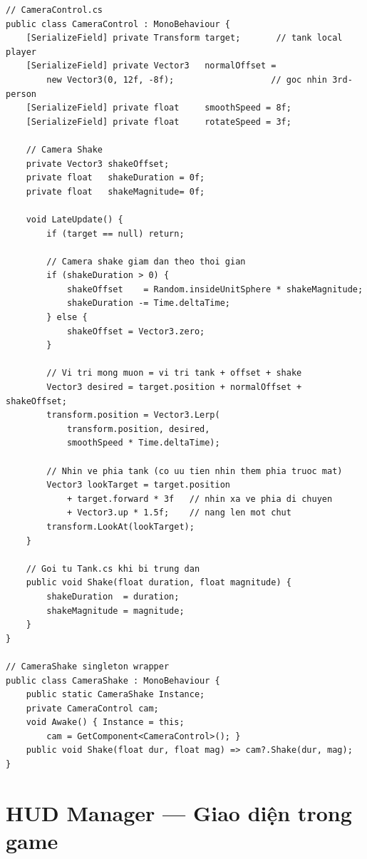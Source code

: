 \documentclass[12pt,a4paper]{report}
\begin{document}
\begin{lstlisting}[style=bashStyle, caption={CameraControl --- smooth follow camera với camera shake}, label={lst:camera}]
// CameraControl.cs
public class CameraControl : MonoBehaviour {
    [SerializeField] private Transform target;       // tank local player
    [SerializeField] private Vector3   normalOffset =
        new Vector3(0, 12f, -8f);                   // goc nhin 3rd-person
    [SerializeField] private float     smoothSpeed = 8f;
    [SerializeField] private float     rotateSpeed = 3f;

    // Camera Shake
    private Vector3 shakeOffset;
    private float   shakeDuration = 0f;
    private float   shakeMagnitude= 0f;

    void LateUpdate() {
        if (target == null) return;

        // Camera shake giam dan theo thoi gian
        if (shakeDuration > 0) {
            shakeOffset    = Random.insideUnitSphere * shakeMagnitude;
            shakeDuration -= Time.deltaTime;
        } else {
            shakeOffset = Vector3.zero;
        }

        // Vi tri mong muon = vi tri tank + offset + shake
        Vector3 desired = target.position + normalOffset + shakeOffset;
        transform.position = Vector3.Lerp(
            transform.position, desired,
            smoothSpeed * Time.deltaTime);

        // Nhin ve phia tank (co uu tien nhin them phia truoc mat)
        Vector3 lookTarget = target.position
            + target.forward * 3f   // nhin xa ve phia di chuyen
            + Vector3.up * 1.5f;    // nang len mot chut
        transform.LookAt(lookTarget);
    }

    // Goi tu Tank.cs khi bi trung dan
    public void Shake(float duration, float magnitude) {
        shakeDuration  = duration;
        shakeMagnitude = magnitude;
    }
}

// CameraShake singleton wrapper
public class CameraShake : MonoBehaviour {
    public static CameraShake Instance;
    private CameraControl cam;
    void Awake() { Instance = this;
        cam = GetComponent<CameraControl>(); }
    public void Shake(float dur, float mag) => cam?.Shake(dur, mag);
}
\end{lstlisting}

\section{HUD Manager --- Giao diện trong game}
\end{document}
